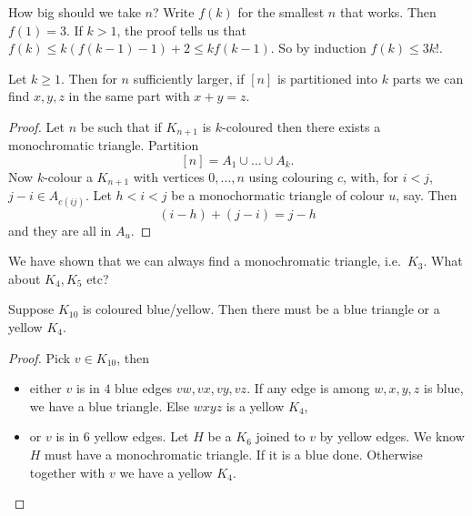 \documentclass[a4paper]{article}
\begin{document}
\begin{remark}
  How big should we take \(n\)? Write \(f(k)\) for the smallest \(n\) that works. Then \(f(1) = 3\). If \(k > 1\), the proof tells us that \(f(k) \leq k(f(k - 1) - 1) + 2 \leq k f(k - 1)\). So by induction \(f(k) \leq 3k!\).
\end{remark}

\begin{corollary}
  Let \(k \geq 1\). Then for \(n\) sufficiently larger, if \([n]\) is partitioned into \(k\) parts we can find \(x, y, z\) in the same part with \(x + y = z\).
\end{corollary}

\begin{proof}
  Let \(n\) be such that if \(K_{n + 1}\) is \(k\)-coloured then there exists a monochromatic triangle. Partition
  \[
    [n] = A_1 \cup \dots \cup A_k.
  \]
  Now \(k\)-colour a \(K_{n + 1}\) with vertices \(0, \dots, n\) using colouring \(c\), with, for \(i < j\), \(j - i \in A_{c(ij)}\). Let \(h < i < j\) be a monochormatic triangle of colour \(u\), say. Then
  \[
    (i - h) + (j - i) = j - h
  \]
  and they are all in \(A_u\).
\end{proof}

We have shown that we can always find a monochromatic triangle, i.e.\ \(K_3\). What about \(K_4, K_5\) etc?

\begin{eg}
  Suppose \(K_{10}\) is coloured blue/yellow. Then there must be a blue triangle or a yellow \(K_4\).

  \begin{proof}
    Pick \(v \in K_{10}\), then
    \begin{itemize}
    \item either \(v\) is in \(4\) blue edges \(vw, vx, vy, vz\). If any edge is among \(w, x, y, z\) is blue, we have a blue triangle. Else \(wxyz\) is a yellow \(K_4\),
      \begin{center}
      \end{center}
    \item or \(v\) is in \(6\) yellow edges. Let \(H\) be a \(K_6\) joined to \(v\) by yellow edges. We know \(H\) must have a monochromatic triangle. If it is a blue done. Otherwise together with \(v\) we have a yellow \(K_4\).
    \end{itemize}
  \end{proof}
\end{eg}
\end{document}
